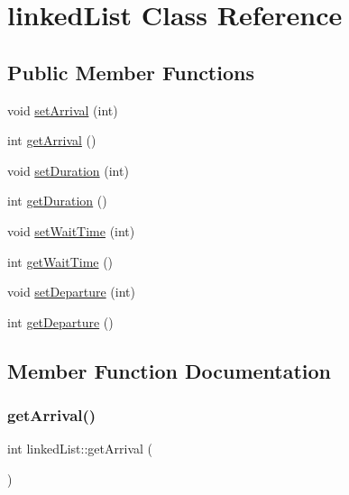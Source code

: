 \hypertarget{classlinked_list}{}\section{linked\+List Class Reference}
\label{classlinked_list}
\subsection*{Public Member Functions}
\begin{DoxyCompactItemize}
\item 
void \mbox{\hyperlink{classlinked_list_a1a2f18904ea46c14b153cbc7f9201c06}{set\+Arrival}} (int)
\item 
int \mbox{\hyperlink{classlinked_list_a5ceed8bea4dadfe793f1508a5f7a28f6}{get\+Arrival}} ()
\item 
void \mbox{\hyperlink{classlinked_list_a1a1d1fb53e005c7eecb2790aa84ad761}{set\+Duration}} (int)
\item 
int \mbox{\hyperlink{classlinked_list_abeb787b0ae7ead2c483355f3a349de45}{get\+Duration}} ()
\item 
void \mbox{\hyperlink{classlinked_list_a6f1132995025b714df0591209fb14af5}{set\+Wait\+Time}} (int)
\item 
int \mbox{\hyperlink{classlinked_list_a091107578b2804e7a03dbc7ce8c05348}{get\+Wait\+Time}} ()
\item 
void \mbox{\hyperlink{classlinked_list_a6ba130a20a2de8854acf893e2c18e7d2}{set\+Departure}} (int)
\item 
int \mbox{\hyperlink{classlinked_list_ab020f1ba62c4122bd272036f92456622}{get\+Departure}} ()
\end{DoxyCompactItemize}


\subsection{Member Function Documentation}
\mbox{\label{classlinked_list_a5ceed8bea4dadfe793f1508a5f7a28f6}} 
\subsubsection{\texorpdfstring{get\+Arrival()}{getArrival()}}
{\footnotesize\ttfamily int linked\+List\+::get\+Arrival (\begin{DoxyParamCaption}{ }\end{DoxyParamCaption})}

